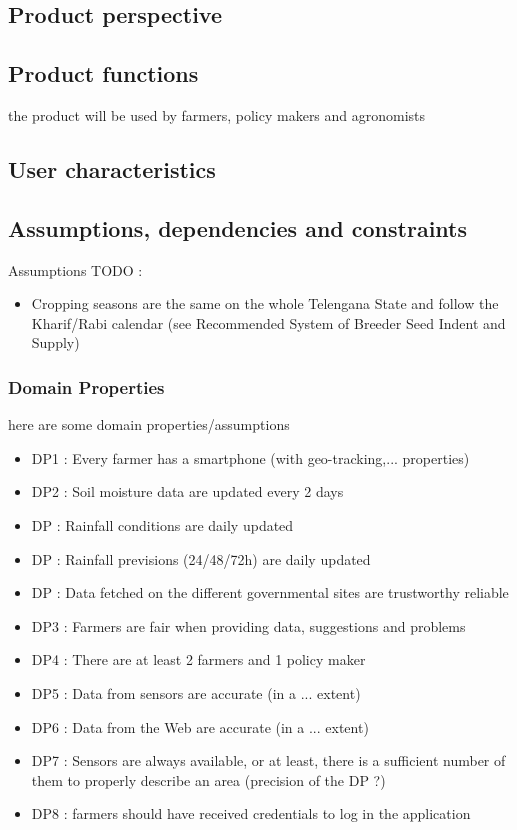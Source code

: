 \subsection{Product perspective}
\subsection{Product functions}
the product will be used by farmers, policy makers and agronomists
\subsection{User characteristics}
\subsection{Assumptions, dependencies and constraints}
Assumptions TODO :
\begin{itemize}
	\item
	Cropping seasons are the same on the whole Telengana State and follow the Kharif/Rabi calendar (see Recommended System of Breeder Seed Indent and Supply)
\end{itemize}
\subsubsection{Domain Properties}
here are some domain properties/assumptions
\begin{itemize}
	\item
	DP1 : Every farmer has a smartphone (with geo-tracking,... properties)
	\item
	DP2 : Soil moisture data are updated every 2 days
	\item
	DP : Rainfall conditions are daily updated
	\item
	DP : Rainfall previsions (24/48/72h) are daily updated
	\item
	DP : Data fetched on the different governmental sites are trustworthy reliable
	\item
	DP3 : Farmers are fair when providing data, suggestions and problems
	\item
	DP4 : There are at least 2 farmers and 1 policy maker
	\item
	DP5 : Data from sensors are accurate (in a ... extent)
	\item
	DP6 : Data from the Web are accurate (in a ... extent)
	\item
	DP7 : Sensors are always available, or at least, there is a sufficient number of them to properly describe an area (precision of the DP ?)
	\item
	DP8 : farmers should have received credentials to log in the application
	
\end{itemize}


